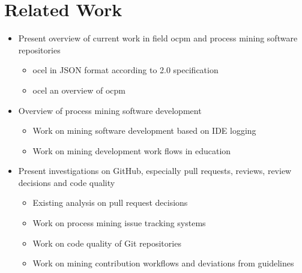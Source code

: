 \chapter{Related Work}
\label{chap:related_work}
\begin{itemize}
	\item Present overview of current work in field \ac{ocpm} and process mining software repositories
	\begin{itemize}
		\item \ac{ocel} in JSON format according to 2.0 specification \autocite{DBLP:journals/corr/abs-2403-01975}
		\item \ac{ocel} an overview of \ac{ocpm} \autocite{DBLP:conf/ictac/Aalst21a}
	\end{itemize}
	\item Overview of process mining software development
	\begin{itemize}
		\item Work on mining software development based on IDE logging \autocite{DBLP:conf/ispw/ArdimentoBCM19, DBLP:conf/iccsa/ChaturvediSS13}
		\item Work on mining development work flows in education \autocite{DBLP:conf/edm/DumbachAZE20, DBLP:journals/eait/MacakKCB21}
	\end{itemize}
	\item Present investigations on GitHub, especially pull requests, reviews, review decisions and code quality
	\begin{itemize}
		\item Existing analysis on pull request decisions \autocite{DBLP:journals/tse/ZhangYGR23, DBLP:conf/icncc/PooputM18}
		\item Work on process mining issue tracking systems \autocite{DBLP:conf/icsm/CoremansKRKFC23}
		\item Work on code quality of Git repositories \autocite{DBLP:journals/corr/abs-2203-04374, Scholar:apostolidis2023evaluation}
		\item Work on mining contribution workflows and deviations from guidelines \autocite{DBLP:conf/icsm/ElazharySEZ19, DBLP:conf/icse/Liu0MKYXGG24}
	\end{itemize}
\end{itemize}

